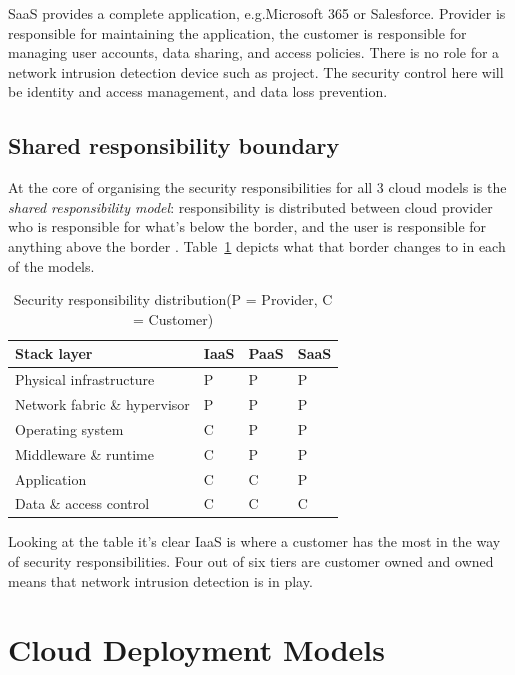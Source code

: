 \ac{SaaS} provides a complete application, e.g.Microsoft 365 or Salesforce. Provider is responsible for maintaining the application, the customer is responsible for managing user accounts, data sharing, and access policies. There is no role for a network intrusion detection device such as project. The security control here will be identity and access management, and data loss prevention.

\subsection{Shared responsibility boundary}

At the core of organising the security responsibilities for all 3 cloud models is the \textit{shared responsibility model}: responsibility is distributed between cloud provider who is responsible for what’s below the border, and the user is responsible for anything above the border \cite{nist2011architecture}. Table~\ref{tab:shared_responsibility} depicts what that border changes to in each of the models.

\begin{table}[H]
  \centering
  \caption{Security responsibility distribution(P = Provider, C = Customer)}
  \label{tab:shared_responsibility}
  \renewcommand{\arraystretch}{1.4}
  \begin{tabularx}{\textwidth}{lXXX}
    \toprule
    \textbf{Stack layer} & \textbf{IaaS} & \textbf{PaaS} & \textbf{SaaS} \\
    \midrule
    Physical infrastructure & P & P & P \\
    Network fabric \& hypervisor & P & P & P \\
    Operating system & C & P & P \\
    Middleware \& runtime & C & P & P \\
    Application & C & C & P \\
    Data \& access control & C & C & C \\
    \bottomrule
  \end{tabularx}
\end{table}

Looking at the table it’s clear IaaS is where a customer has the most in the way of security responsibilities. Four out of six tiers are customer owned and owned means that network intrusion detection is in play.

\section{Cloud Deployment Models}
\label{sec:deployment_models}

